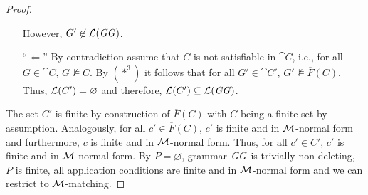 \begin{proof}
\begin{itemize}
  However, $G' \not\in \mathcal{L}(\mathit{GG})$.
  \item[``$\Leftarrow$''] By contradiction assume that $C$ is not satisfiable in $\cat{C}$, i.e., for all $G \in \cat{C}$, $G \not\models C$.
  By $(*^3)$ it follows that for all $G' \in \cat{C'}$, $G' \not\models \overline{F}(C)$.
  Thus, $\mathcal{L}(C')=\varnothing$ and therefore, $\mathcal{L}(C') \subseteq \mathcal{L}(\mathit{GG})$.
\end{itemize}
The set $C'$ is finite by construction of $\overline{F}(C)$ with $C$ being a finite set by assumption.
Analogously, for all $c' \in \overline{F}(C)$, $c'$ is finite and in ${\cal M}$-normal form and furthermore, $c$ is finite and in ${\cal M}$-normal form.
Thus, for all $c' \in C'$, $c'$ is finite and in ${\cal M}$-normal form.
By $P=\varnothing$, grammar $\mathit{GG}$ is trivially non-deleting, $P$ is finite, all application conditions are finite and in ${\cal M}$-normal form and we can restrict to ${\cal M}$-matching.
\end{proof}
